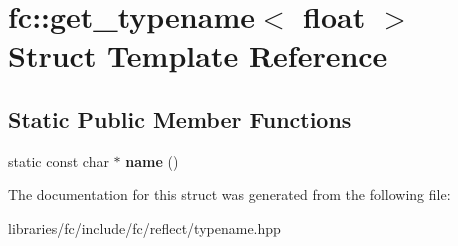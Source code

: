 \hypertarget{structfc_1_1get__typename_3_01float_01_4}{}\section{fc\+:\+:get\+\_\+typename$<$ float $>$ Struct Template Reference}
\label{structfc_1_1get__typename_3_01float_01_4}
\subsection*{Static Public Member Functions}
\begin{DoxyCompactItemize}
\item 
\mbox{\label{structfc_1_1get__typename_3_01float_01_4_a60b0e568d9c3b4946c0024af02710783}} 
static const char $\ast$ {\bfseries name} ()
\end{DoxyCompactItemize}


The documentation for this struct was generated from the following file\+:\begin{DoxyCompactItemize}
\item 
libraries/fc/include/fc/reflect/typename.\+hpp\end{DoxyCompactItemize}
